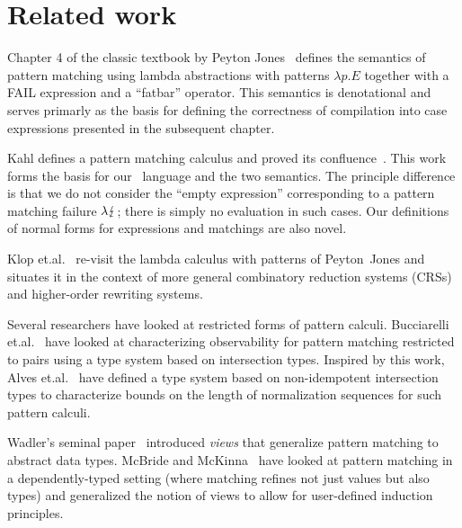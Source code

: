
\section{Related work}\label{sec:related}

Chapter 4 of the classic textbook by Peyton Jones~\cite{spj_1987}
defines the semantics of pattern matching using lambda abstractions
with patterns $\lambda p.E$ together with a \textsf{FAIL} expression
and a ``fatbar'' operator. This semantics is
denotational and serves primarly as the basis for defining the
correctness of compilation into case expressions presented in
the subsequent chapter.

Kahl defines a pattern matching calculus and proved its
confluence~\cite{kahl_2004}. This work forms the basis for our
\lambdaPMC\ language and the two semantics. The principle difference
is that we do not consider the ``empty expression'' corresponding to a
pattern matching failure $\lambda\lightning$; there is simply no
evaluation in such cases.  Our definitions of normal forms for expressions
and matchings
are also novel. %

Klop et.\@ al.\@~\cite{KLOP200816} re-visit the lambda calculus with
patterns of Peyton~Jones and situates it in the context of more
general combinatory reduction systems (CRSs) and higher-order
rewriting systems.

Several researchers have looked at restricted forms of pattern
calculi.  Bucciarelli et.\@ al.\@~\cite{bucciarelli_et_al_2015} have
looked at characterizing observability for pattern matching restricted
to pairs using a type system based on intersection types.  Inspired by
this work, Alves et.\@ al.\@~\cite{alves_et_al_2020} have defined a
type system based on non-idempotent intersection types to characterize
bounds on the length of normalization sequences for such pattern
calculi.

Wadler's seminal paper~\cite{wadler_1987} introduced \emph{views} that
generalize pattern matching to abstract data types.
McBride and McKinna~\cite{mcbride_mckinna_2004} have looked at pattern
matching in a dependently-typed setting (where matching refines not
just values but also types) and generalized the notion of views to
allow for  user-defined induction principles.  




